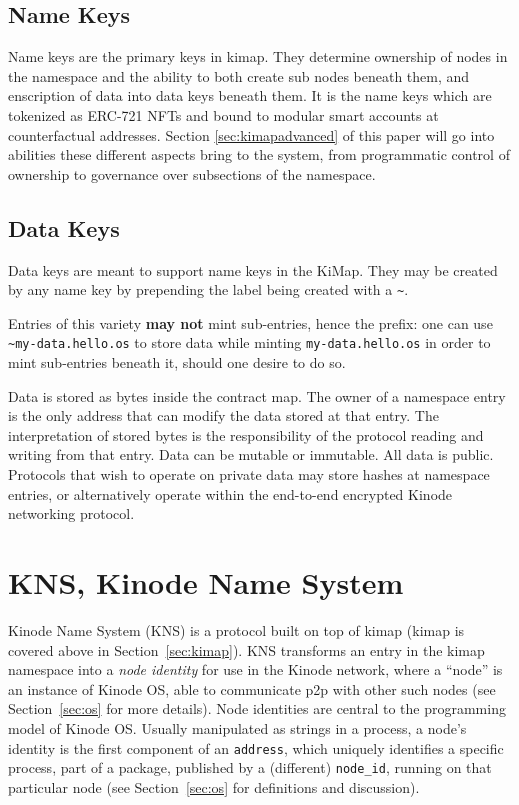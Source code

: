 \documentclass[runningheads]{llncs}
\begin{document}
\subsection{Name Keys}

Name keys are the primary keys in kimap. 
They determine ownership of nodes in the namespace and the ability to both create sub nodes beneath them, and enscription of data into data keys beneath them.
It is the name keys which are tokenized as ERC-721 NFTs and bound to modular smart accounts at counterfactual addresses. 
Section \ref{sec:kimapadvanced} of this paper will go into abilities these different aspects bring to the system, from programmatic control of ownership to governance over subsections of the namespace.

\subsection{Data Keys}
\label{sec:terminalnodes}

Data keys are meant to support name keys in the KiMap. They may be created by any name key by prepending the label being created with a \verb|~|.

Entries of this variety \textbf{may not} mint sub-entries, hence the prefix: one can use \verb|~my-data.hello.os| to store data while minting \verb|my-data.hello.os| in order to mint sub-entries beneath it, should one desire to do so.

Data is stored as bytes inside the contract map.
The owner of a namespace entry is the only address that can modify the data stored at that entry.
The interpretation of stored bytes is the responsibility of the protocol reading and writing from that entry.
Data can be mutable or immutable.
All data is public.
Protocols that wish to operate on private data may store hashes at namespace entries, or alternatively operate within the end-to-end encrypted Kinode networking protocol.


\section{KNS, Kinode Name System}
\label{sec:kns}

Kinode Name System (KNS) is a protocol built on top of kimap (kimap is covered above in Section~\ref{sec:kimap}).
KNS transforms an entry in the kimap namespace into a \textit{node identity} for use in the Kinode network, where a ``node'' is an instance of Kinode OS, able to communicate p2p with other such nodes (see Section~\ref{sec:os} for more details).
Node identities are central to the programming model of Kinode OS.
Usually manipulated as strings in a process, a node's identity is the first component of an \verb|address|, which uniquely identifies a specific process, part of a package, published by a (different) \verb|node_id|, running on that particular node (see Section~\ref{sec:os} for definitions and discussion).
\end{document}

